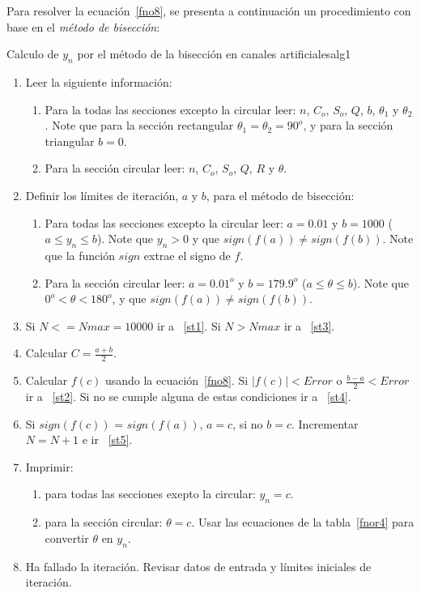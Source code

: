 \documentclass[11pt, oneside]{article}
\begin{document}
Para resolver la ecuaci\'on~\ref{fno8}, se presenta a continuaci\'on un procedimiento con base en el \emph{m\'etodo de bisecci\'on}:
\begin{alg}{Calculo de $y_n$ por el m\'etodo de la bisecci\'on en canales artificiales}{alg1}
\begin{enumerate}
\item Leer la siguiente información:

\begin{enumerate}
\item Para la todas las secciones excepto la circular leer: $n$, $C_o$, $S_o$, $Q$, $b$, $\theta_1$ y $\theta_2$. Note que para la secci\'on rectangular $\theta_1 = \theta_2 = 90^o$, y para la secci\'on triangular $b=0$.
\item Para la secci\'on circular leer: $n$, $C_o$, $S_o$, $Q$, $R$ y $\theta$.
\end{enumerate}

\item Definir los l\'imites de iteraci\'on, $a$ y $b$, para el m\'etodo de bisecci\'on:
\begin{enumerate}
\item Para todas las secciones excepto la circular leer: $a = 0.01$ y $b=1000$ ($a \le y_n \le b$). Note que $y_n > 0$ y que $sign(f(a)) \neq sign(f(b)) $. Note que la funci\'on $sign$ extrae el signo de $f$.
\item Para la secci\'on circular leer: $a=0.01^o$ y $b=179.9^o$ ($a \le \theta \le b$). Note que $ 0^o < \theta < 180^o $, y que $sign(f(a)) \neq sign(f(b)) $. 
\end{enumerate}

\item \label{st5} Si $N <= Nmax=10000$ ir a ~\ref{st1}. Si $N > Nmax$ ir a ~\ref{st3}.  
\item \label{st1} Calcular $C = \frac{a+b}{2}$.
\item Calcular $f(c)$ usando la ecuaci\'on~\ref{fno8}. Si $|f(c)|< Error$ o $\frac{b-a}{2} < Error$ ir a ~\ref{st2}. Si no se cumple alguna de estas  condiciones ir a ~\ref{st4}.

\item \label{st4} Si $sign(f(c))$ = $sign(f(a))$, $a=c$, si no $b=c$. Incrementar $N=N+1$ e ir ~\ref{st5}. 

\item \label{st2} Imprimir:
\begin{enumerate}
\item para todas las secciones exepto la circular: $y_n = c$.
\item para la secci\'on circular: $\theta = c$. Usar las ecuaciones de la tabla~\ref{fnor4} para convertir $\theta$ en $y_n$.
\end{enumerate}

\item \label{st3} Ha fallado la iteraci\'on. Revisar datos de entrada y l\'imites iniciales de iteraci\'on.

\end{enumerate}
\end{alg}
\end{document}

